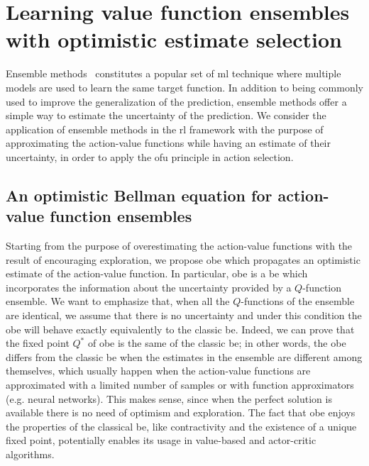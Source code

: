 \section{Learning value function ensembles with optimistic estimate selection}
\label{sec:obe}
Ensemble methods~\cite{opitz1999popular} constitutes a popular set of \gls{ml} technique where multiple models are used to learn the same target function. In addition to being commonly used to improve the generalization of the prediction, ensemble methods offer a simple way to estimate the uncertainty of the prediction. We consider the application of ensemble methods in the \gls{rl} framework with the purpose of approximating the action-value functions while having an estimate of their uncertainty, in order to apply the \gls{ofu} principle in action selection.

\subsection{An optimistic Bellman equation for action-value function ensembles}
Starting from the purpose of overestimating the action-value functions with the result of encouraging exploration, we propose \gls{obe} which propagates an optimistic estimate of the action-value function. In particular, \gls{obe} is a \gls{be} which incorporates the information about the uncertainty provided by a $Q$-function ensemble. We want to emphasize that, when all the $Q$-functions of the ensemble are identical, we assume that there is no uncertainty and under this condition the \gls{obe} will behave exactly equivalently to the classic \gls{be}. Indeed, we can prove that the fixed point $Q^*$ of \gls{obe} is the same of the classic \gls{be}; in other words, the \gls{obe} differs from the classic \gls{be} when the estimates in the ensemble are different among themselves, which usually happen when the action-value functions are approximated with a limited number of samples or with function approximators (e.g. neural networks). This makes sense, since when the perfect solution is available there is no need of optimism and exploration. 
The fact that \gls{obe} enjoys the properties of the classical \gls{be}, like contractivity and the existence of a unique fixed point, potentially enables its usage in value-based and actor-critic algorithms.

